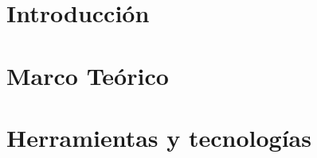 \documentclass[spanish,a4paper,12pt,twoside,openright]{extreport}
\begin{document}
\listoftables

\newpage{\pagestyle{empty}}

\newpage
\thispagestyle{empty}

\renewcommand{\thepage}{\arabic{page}}
\setcounter{page}{1}
\pagestyle{plain}

\chapter{\LARGE Introducción}
\label{chapter:introduction}






\newpage{\pagestyle{empty}}
\thispagestyle{empty}

\chapter{\LARGE Marco Teórico}
\label{chapter:theoreticalFramework}






\newpage{\pagestyle{empty}}
\thispagestyle{empty}

\chapter{\LARGE Herramientas y tecnologías}
\label{chapter:toolsAndTechnologies}








\end{document}
